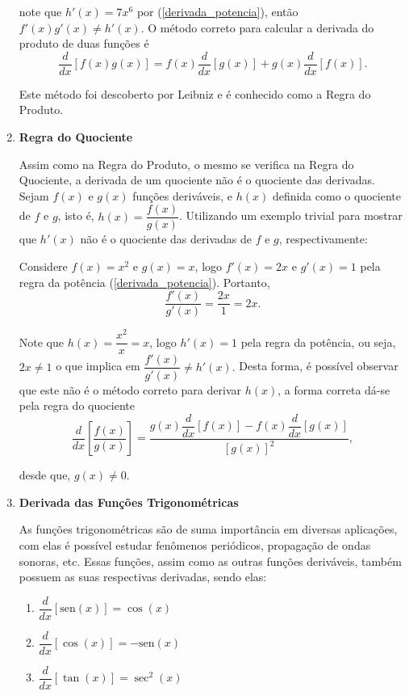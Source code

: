 \documentclass[
	12pt,				%
	openright,			%
    twoside,			%
	a4paper,			%
	chapter=TITLE,		%
	english,			%
	french,				%
	spanish,			%
	brazil				%
	]{abntex2}
\numberwithin{lema}{chapter}
\numberwithin{teorema}{chapter}
\numberwithin{definicao}{chapter}
\numberwithin{exemplo}{chapter}
\numberwithin{figure}{chapter}
\begin{document}
\begin{enumerate}
	note que $h'(x) = 7x^{6}$ por (\ref{derivada_potencia}), então $f'(x)g'(x) \neq h'(x)$. O método correto para calcular a derivada do produto de duas funções é
	$$  \dfrac{d}{dx}[f(x)g(x)] = f(x)\dfrac{d}{dx}[g(x)] + g(x)\dfrac{d}{dx}[f(x)]. $$
	
	Este método foi descoberto por Leibniz e é conhecido como a Regra do Produto.
	
	\item \textbf{Regra do Quociente}
	
	Assim como na Regra do Produto, o mesmo se verifica na Regra do Quociente, a derivada de um quociente não é o quociente das derivadas. Sejam $f(x)$ e $g(x)$ funções deriváveis, e $h(x)$ definida como o quociente de $f$ e $g$, isto é, $h(x) = \dfrac{f(x)}{g(x)}$. Utilizando um exemplo trivial para mostrar que $h'(x)$ não é o quociente das derivadas de $f$ e $g$, respectivamente:
	
	Considere $f(x) = x^{2}$ e $g(x) = x$, logo $f'(x) = 2x$ e $g'(x) = 1$ pela regra da potência (\ref{derivada_potencia}). Portanto, $$\dfrac{f'(x)}{g'(x)} = \dfrac{2x}{1} = 2x.$$
	
	Note que $h(x) = \dfrac{x^{2}}{x} = x$, logo $h'(x) = 1$ pela regra da potência, ou seja, $2x \neq 1$ o que implica em $\dfrac{f'(x)}{g'(x)} \neq h'(x).$ Desta forma, é possível observar que este não é o método correto para derivar $h(x)$, a forma correta dá-se pela regra do quociente	
	$$  \dfrac{d}{dx}\left[ \dfrac{f(x)}{g(x)} \right] = \dfrac{g(x)\dfrac{d}{dx}[f(x)] - f(x)\dfrac{d}{dx}[g(x)]}{[g(x)]^{2}}, $$ 
	
	desde que, $g(x) \neq 0$.
	
	\item \textbf{Derivada das Funções Trigonométricas}
	\label{derivada_trigonometricas}
	
	As funções trigonométricas são de suma importância em diversas aplicações, com elas é possível estudar fenômenos periódicos, propagação de ondas sonoras, etc. Essas funções, assim como as outras funções deriváveis, também possuem as suas respectivas derivadas, sendo elas:
	
	\begin{enumerate}
		\item $ \dfrac{d}{dx}[\text{sen}(x)] = \cos(x) $
		\label{derivada_seno}
		
		\item $ \dfrac{d}{dx}[\cos(x)] = -\text{sen}(x)$
		\label{derivada_cosseno}
		
		\item $ \dfrac{d}{dx}[\tan(x)] = \sec^{2}(x)$
		\label{derivada_tangente}
		

\end{enumerate}
\end{enumerate}
\end{document}
